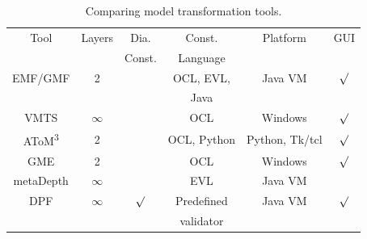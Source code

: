  
\begin{table}[ht]
\renewcommand*\arraystretch{1.5}
\centering
\begin{tabular}{| c | c | c | c | c | c |}
\hline
Tool & Layers & Dia.   & Const.   & Platform & GUI\\
	 & 		  & Const. & Language &          & \\
\hline
EMF/GMF & 2 & & OCL, EVL, & Java VM & $\surd$ \\
		&  	& & Java      &         & \\
\hline
VMTS    & $\infty$ & & OCL & Windows & $\surd$ \\
\hline
AToM\textsuperscript{3} & 2 & & OCL, Python & Python, Tk/tcl & $\surd$ \\
\hline
GME  & 2 & & OCL & Windows & $\surd$ \\
\hline
metaDepth & $\infty$ & & EVL & Java VM & \\
\hline
DPF & $\infty$ & $\surd$ & Predefined & Java VM & $\surd$ \\
	& 		   &         & validator  &         & \\
\hline

\end{tabular}
\caption{Comparing model transformation tools.}
\end{table} 